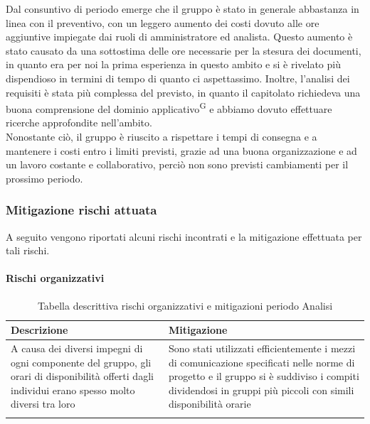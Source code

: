 Dal consuntivo di periodo emerge che il gruppo è stato in generale abbastanza in linea con il preventivo,
 con un leggero aumento dei costi dovuto alle ore aggiuntive impiegate dai ruoli di amministratore ed analista.
Questo aumento è stato causato da una sottostima delle ore necessarie per la stesura dei documenti,
 in quanto era per noi la prima esperienza in questo ambito e si è rivelato più dispendioso in termini di tempo di quanto ci aspettassimo.
Inoltre, l'analisi dei requisiti è stata più complessa del previsto, in quanto il capitolato richiedeva una buona comprensione
 del dominio applicativo\textsuperscript{G} e abbiamo dovuto effettuare ricerche approfondite nell'ambito.\\
Nonostante ciò, il gruppo è riuscito a rispettare i tempi di consegna e a mantenere i costi entro i limiti previsti, grazie ad una buona organizzazione
 e ad un lavoro costante e collaborativo, perciò non sono previsti cambiamenti per il prossimo periodo.\\

\newpage
\subsubsection{Mitigazione rischi attuata}\label{sec:consuntivo:analisi:mitigazione}

A seguito vengono riportati alcuni rischi incontrati e la mitigazione effettuata per tali rischi.\\

\paragraph{Rischi organizzativi}

\begin{center}


    \begin{xltabular}{\textwidth}{| X | X |}
                
        \textbf{\color{white} Descrizione} & \textbf{\color{white} Mitigazione}\\ 
        \endhead
    
        A causa dei diversi impegni di ogni componente del gruppo, gli orari di disponibilità offerti dagli individui erano spesso molto diversi tra loro &
        Sono stati utilizzati efficientemente i mezzi di comunicazione specificati nelle norme di progetto e il gruppo si è suddiviso i compiti dividendosi in gruppi più piccoli
        con simili disponibilità orarie \\
        \hline
            
        \caption{Tabella descrittiva rischi organizzativi e mitigazioni periodo Analisi}\label{tab:rischi_organizzativi_analisi}
    \end{xltabular}
\end{center}

